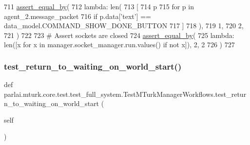 \begin{DoxyCode}
711         \hyperlink{namespaceparlai_1_1mturk_1_1core_1_1test_1_1test__full__system_a0b463246d35658a2e422010f13dcf819}{assert\_equal\_by}(
712             \textcolor{keyword}{lambda}: len(
713                 [
714                     p
715                     \textcolor{keywordflow}{for} p \textcolor{keywordflow}{in} agent\_2.message\_packet
716                     \textcolor{keywordflow}{if} p.data[\textcolor{stringliteral}{'text'}] == data\_model.COMMAND\_SHOW\_DONE\_BUTTON
717                 ]
718             ),
719             1,
720             2,
721         )
722 
723         \textcolor{comment}{# Assert sockets are closed}
724         \hyperlink{namespaceparlai_1_1mturk_1_1core_1_1test_1_1test__full__system_a0b463246d35658a2e422010f13dcf819}{assert\_equal\_by}(
725             \textcolor{keyword}{lambda}: len([x \textcolor{keywordflow}{for} x \textcolor{keywordflow}{in} manager.socket\_manager.run.values() \textcolor{keywordflow}{if} \textcolor{keywordflow}{not} x]), 2, 2
726         )
727 
\end{DoxyCode}
\mbox{\label{classparlai_1_1mturk_1_1core_1_1test_1_1test__full__system_1_1TestMTurkManagerWorkflows_a1c8e8bb8eca161157b7b5dc154b687f6}} 
\subsubsection{\texorpdfstring{test\+\_\+return\+\_\+to\+\_\+waiting\+\_\+on\+\_\+world\+\_\+start()}{test\_return\_to\_waiting\_on\_world\_start()}}
{\footnotesize\ttfamily def parlai.\+mturk.\+core.\+test.\+test\+\_\+full\+\_\+system.\+Test\+M\+Turk\+Manager\+Workflows.\+test\+\_\+return\+\_\+to\+\_\+waiting\+\_\+on\+\_\+world\+\_\+start (\begin{DoxyParamCaption}\item[{}]{self }\end{DoxyParamCaption})}



